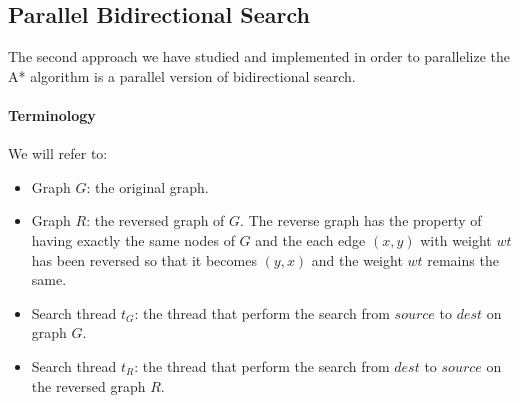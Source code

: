 \documentclass[twocolumn, switch]{article} %
\begin{document}
\subsection{Parallel Bidirectional Search}
The second approach we have studied and implemented in order to parallelize the A* algorithm
is a parallel version of bidirectional search.
\paragraph{Terminology}
We will refer to:
\begin{itemize}
  \item Graph $G$: the original graph.
  \item Graph $R$: the reversed graph of $G$. The reverse graph has the property of having
        exactly the same nodes of $G$ and the each edge $(x, y)$ with weight $wt$ has been
        reversed so that it becomes $(y, x)$ and the weight $wt$ remains the same.
  \item Search thread $t_G$: the thread that perform the search from $source$ to $dest$
        on graph $G$.
  \item Search thread $t_R$: the thread that perform the search from $dest$ to $source$
        on the reversed graph $R$.
\end{itemize}
\end{document}
